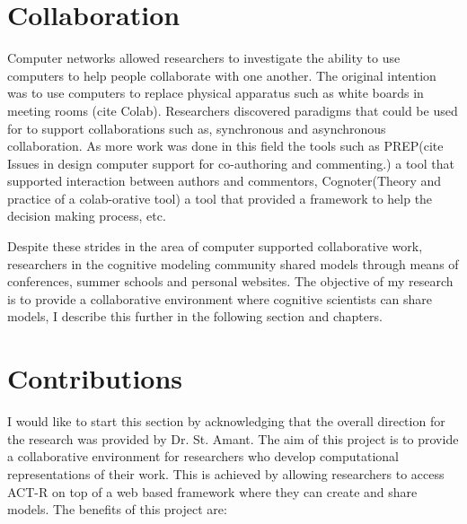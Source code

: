 \section {Collaboration}
Computer networks allowed researchers
to investigate the ability to use computers to help people collaborate
with one another. The original intention was to use computers to replace
physical apparatus such as white boards in meeting rooms (cite Colab). 
Researchers discovered paradigms that could be used for to support
collaborations such as, synchronous and asynchronous collaboration. As
more work was done in this field the tools such as PREP(cite Issues in
design computer support for co-authoring and commenting.) a tool that
supported interaction between authors and commentors,
Cognoter(Theory and practice of a colab-orative tool) a tool that
provided a framework to help the decision making process, etc.

Despite these strides in the area of computer supported collaborative
work, researchers in the cognitive modeling community 
shared models through means of conferences, summer schools and
personal websites. The objective of my research is to provide a
collaborative environment where cognitive scientists can share
models, I describe this further in the following section and chapters.

\section{Contributions}

I would like to start this section by acknowledging that the overall
direction for the research was provided by Dr. St. Amant. The aim of
this project is to provide a collaborative environment for researchers
who develop computational representations of their work. This is
achieved by allowing researchers to access ACT-R on top of a web based
framework where they can create and share models. The benefits of this
project are:

